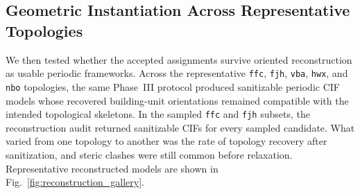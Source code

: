 \documentclass[pdflatex,sn-mathphys-num]{sn-jnl}
\theoremstyle{thmstyleone}%
\begin{document}
\subsection*{Geometric Instantiation Across Representative Topologies}
\label{sec:validation}


We then tested whether the accepted assignments survive oriented reconstruction as usable periodic frameworks. Across the representative \texttt{ffc}, \texttt{fjh}, \texttt{vba}, \texttt{hwx}, and \texttt{nbo} topologies, the same Phase~III protocol produced sanitizable periodic CIF models whose recovered building-unit orientations remained compatible with the intended topological skeletons. In the sampled \texttt{ffc} and \texttt{fjh} subsets, the reconstruction audit returned sanitizable CIFs for every sampled candidate. What varied from one topology to another was the rate of topology recovery after sanitization, and steric clashes were still common before relaxation. Representative reconstructed models are shown in Fig.~\ref{fig:reconstruction_gallery}.
\end{document}
